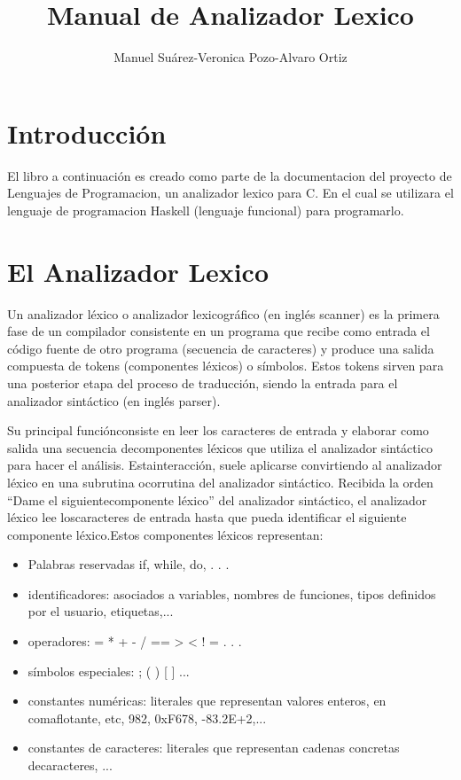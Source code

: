 \documentclass[12pt,oneside]{book}
\title{Manual de Analizador Lexico}
\author{Manuel Suárez-Veronica Pozo-Alvaro Ortiz}
\begin{document}
\maketitle
\tableofcontents

\chapter{Introducción}

El libro a continuación es creado como parte de la documentacion del proyecto de Lenguajes de Programacion, un analizador lexico para C. 
En el cual se utilizara el lenguaje de programacion Haskell (lenguaje funcional) para programarlo.

\chapter{El Analizador Lexico}


	Un analizador léxico o analizador lexicográfico (en inglés scanner) es la primera fase de un compilador consistente en un programa que recibe como entrada el código fuente de otro programa (secuencia de caracteres) y produce una salida compuesta de tokens (componentes léxicos) o símbolos. Estos tokens sirven para una posterior etapa del proceso de traducción, siendo la entrada para el analizador sintáctico (en inglés parser).

	Su principal funciónconsiste en leer los caracteres de entrada y elaborar como salida una secuencia decomponentes léxicos que utiliza el analizador sintáctico para hacer el análisis. Estainteracción, suele aplicarse convirtiendo al analizador léxico en una subrutina ocorrutina del analizador sintáctico. Recibida la orden “Dame el siguientecomponente léxico” del analizador sintáctico, el analizador léxico lee loscaracteres de entrada hasta que pueda identificar el siguiente componente léxico.Estos componentes léxicos representan:

\begin{itemize}

			\item Palabras reservadas
			if, while, do, . . .
			\item identificadores:
			asociados a variables, nombres de funciones, tipos definidos por el usuario, etiquetas,...
			\item operadores:
			= * + - / == > < ! = . . .
			\item símbolos especiales:
			; ( ) [ ] ...
			\item constantes numéricas:
			literales que representan valores enteros, en comaflotante, etc, 982, 0xF678, -83.2E+2,...
			\item constantes de caracteres:
			literales que representan cadenas concretas decaracteres, ...
			\end {itemize}
\end{document}
